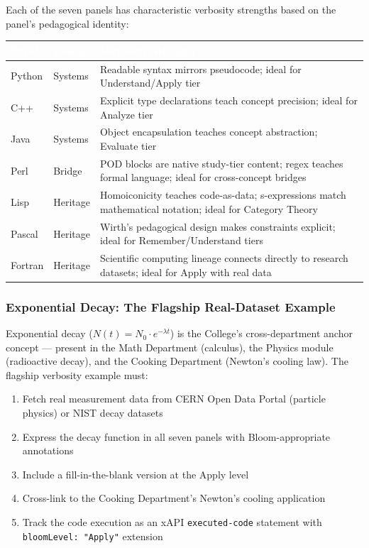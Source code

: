 \documentclass[11pt,letterpaper]{article}
\newcommand{\tableheader}[1]{\textbf{\sffamily\textcolor{white}{#1}}}
\begin{document}
Each of the seven panels has characteristic verbosity strengths based on the panel's pedagogical identity:

\begin{center}
\begin{tabularx}{\textwidth}{L{2.5cm}L{3cm}X}
\toprule
{}
\tableheader{Panel} & \tableheader{Family} & \tableheader{Verbosity Strength} \\
\midrule
Python & Systems & Readable syntax mirrors pseudocode; ideal for Understand/Apply tier \\
C++ & Systems & Explicit type declarations teach concept precision; ideal for Analyze tier \\
Java & Systems & Object encapsulation teaches concept abstraction; Evaluate tier \\
Perl & Bridge & POD blocks are native study-tier content; regex teaches formal language; ideal for cross-concept bridges \\
Lisp & Heritage & Homoiconicity teaches code-as-data; s-expressions match mathematical notation; ideal for Category Theory \\
Pascal & Heritage & Wirth's pedagogical design makes constraints explicit; ideal for Remember/Understand tiers \\
Fortran & Heritage & Scientific computing lineage connects directly to research datasets; ideal for Apply with real data \\
\bottomrule
\end{tabularx}
\end{center}

\subsubsection{Exponential Decay: The Flagship Real-Dataset Example}

Exponential decay ($N(t) = N_0 \cdot e^{-\lambda t}$) is the College's cross-department anchor concept --- present in the Math Department (calculus), the Physics module (radioactive decay), and the Cooking Department (Newton's cooling law). The flagship verbosity example must:

\begin{enumerate}[noitemsep]
  \item Fetch real measurement data from CERN Open Data Portal (particle physics) or NIST decay datasets
  \item Express the decay function in all seven panels with Bloom-appropriate annotations
  \item Include a fill-in-the-blank version at the Apply level
  \item Cross-link to the Cooking Department's Newton's cooling application
  \item Track the code execution as an xAPI \texttt{executed-code} statement with \texttt{bloomLevel: "Apply"} extension
\end{enumerate}
\end{document}
